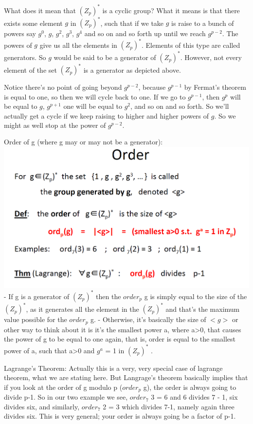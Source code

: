 \documentclass[11pt]{article}
\makeatletter
\def\maxwidth{\ifdim\Gin@nat@width>\linewidth\linewidth
    \else\Gin@nat@width\fi}
\let\Oldincludegraphics\includegraphics
\renewcommand{\includegraphics}[1]{\Oldincludegraphics[width=.8\maxwidth]{#1}}
\makeatother
\begin{document}
What does it mean that \((Z_{p})^{*}\) is a cyclic group? What it means
is that there exists some element \(g\) in \((Z_{p})^{*}\), such that if
we take \(g\) is raise to a bunch of powers say \(g^{0}\), \(g\),
\(g^{2}\), \(g^{3}\), \(g^{4}\) and so on and so forth up until we reach
\(g^{p-2}\). The powers of \(g\) give us all the elements in
\((Z_{p})^{*}\). Elements of this type are called generators. So \(g\)
would be said to be a generator of \((Z_{p})^{*}\). However, not every
element of the set \((Z_{p})^{*}\) is a generator as depicted above.

Notice there's no point of going beyond \(g^{p-2}\), because \(g^{p-1}\)
by Fermat's theorem is equal to one, so then we will cycle back to one.
If we go to \(g^{p-1}\), then \(g^{p}\) will be equal to \(g\),
\(g^{p+1}\) one will be equal to \(g^{2}\), and so on and so forth. So
we'll actually get a cycle if we keep raising to higher and higher
powers of \(g\). So we might as well stop at the power of \(g^{p-2}\).

Order of g (where g may or may not be a generator):
\includegraphics{./Images/NT-OrderOfg.png} - If g is a generator of
\((Z_{p})^{*}\) then the \(order_{p}\) g is simply equal to the size of
the \((Z_{p})^{*}\), as it generates all the element in the
\((Z_{p})^{*}\) and that's the maximum value possible for the
\(order_{p}\) g. - Otherwise, it's basically the size of \(<g>\) or
other way to think about it is it's the smallest power a, where
a\textgreater{}0, that causes the power of g to be equal to one again,
that is, order is equal to the smallest power of a, such that
a\textgreater{}0 and \(g^{a}\) = 1 in \((Z_{p})^{*}\) .

Lagrange's Theorem: Actually this is a very, very special case of
lagrange theorem, what we are stating here. But Langrage's theorem
basically implies that if you look at the order of g modulo p
(\(order_{p}\) g), the order is always going to divide p-1. So in our
two example we see, \(order_{7}\) 3 = 6 and 6 divides 7 - 1, six divides
six, and similarly, \(order_{7}\) 2 = 3 which divides 7-1, namely again
three divides six. This is very general; your order is always going be a
factor of p-1.
\end{document}
